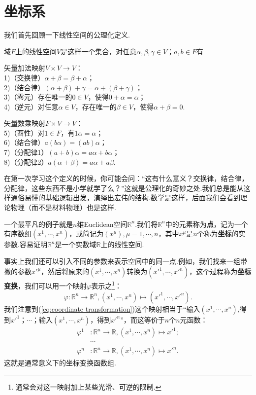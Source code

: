 \section{坐标系}\label{sec:Coordinates}
	我们首先回顾一下线性空间的公理化定义.
	\begin{definition}
		域$F$上的线性空间$V$是这样一个集合，对任意$\alpha,\beta,\gamma\in V$；$a,b\in F$有

		矢量加法映射$V\times V\rightarrow V$：\\
		1)（交换律）$\alpha+\beta=\beta+\alpha$；\\
		2)（结合律）$(\alpha+\beta)+\gamma=\alpha+(\beta+\gamma)$；\\
		3)（零元）存在唯一的$0\in V$，使得$0+\alpha=\alpha$；\\
		4)（逆元）对任意$\alpha\in V$，存在唯一的$\beta\in V$，使得$\alpha+\beta=0$.
		
		矢量数乘映射$F\times V\rightarrow V$：\\
		5)（酉性）对$1\in F$，有$1\alpha=\alpha$；\\
		6)（结合律）$a(b\alpha)=(ab)\alpha$；\\
		7)（分配律1）$(a+b)\alpha=a\alpha+b\alpha$；\\
		8)（分配律2）$a(\alpha+\beta)=a\alpha+a\beta$.
	\end{definition}
	在第一次学习这个定义的时候，你可能会问：“这有什么意义？交换律，结合律，分配律，这些东西不是小学就学了么？”这就是公理化的奇妙之处.我们总是能从这样通俗易懂的基础逻辑出发，演绎出宏伟的结构.数学是这样，后面我们会看到理论物理（而不是材料物理）也是这样.
			
	一个最平凡的例子就是$n$维Euclidean空间$\mathbb{R}^n$.我们将$\mathbb{R}^n$中的元素称为\textbf{点}，记为一个有序数组$(x^1,\cdots,x^n)$，或简记为$(x^\mu),\mu=1,\cdots,n$，其中$x^\mu$是$n$个称为\textbf{坐标}的实参数.容易证明$\mathbb{R}^n$是一个实数域$\mathbb{R}$上的线性空间.
			
	事实上我们还可以引入不同的参数来表示空间中的同一点.例如，我们找来一组带撇的参数$x'^\mu$，然后将原来的$(x^1,\cdots,x^n)$转换为$(x'^1,\cdots,x'^n)$，这个过程称为\textbf{坐标变换}，我们可以用一个映射$\varphi$表示之\footnote{通常会对这一映射加上某些光滑、可逆的限制.}：
	\begin{equation}\label{eq:coordinate transformation}
		\varphi:\mathbb{R}^n\rightarrow \mathbb{R}^n,(x^1,\cdots,x^n)\mapsto (x'^1,\cdots,x'^n).
	\end{equation}
	我们注意到(\ref{eq:coordinate transformation})这个映射相当于“输入$(x^1,\cdots,x^n)$,得到$x'^1$；$\cdots$；输入$(x^1,\cdots,x^n)$，得到$x'^n$”，而这等价于$n$个$n$元函数：
	\begin{equation}
		\begin{split}
			\varphi^1&:\mathbb{R}^n\rightarrow \mathbb{R},(x^1,\cdots,x^n)\mapsto x'^1;\\
			&\cdots\\
			\varphi^n&:\mathbb{R}^n\rightarrow \mathbb{R},(x^1,\cdots,x^n)\mapsto x'^n.
		\end{split}
	\end{equation}
	这就是通常意义下的坐标变换函数组.
			
